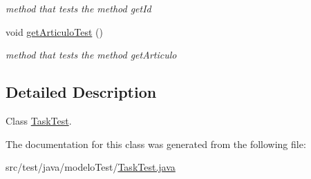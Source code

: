 \begin{DoxyCompactItemize}
\begin{DoxyCompactList}\small\item\em method that tests the method get\+Id \end{DoxyCompactList}\item 
\mbox{\label{classmodelo_test_1_1_task_test_ac7cb90633bdd40e104b1fb9a55f4eea3}} 
void \mbox{\hyperlink{classmodelo_test_1_1_task_test_ac7cb90633bdd40e104b1fb9a55f4eea3}{get\+Articulo\+Test}} ()
\begin{DoxyCompactList}\small\item\em method that tests the method get\+Articulo \end{DoxyCompactList}\end{DoxyCompactItemize}


\subsection{Detailed Description}
Class \mbox{\hyperlink{classmodelo_test_1_1_task_test}{Task\+Test}}. 

The documentation for this class was generated from the following file\+:\begin{DoxyCompactItemize}
\item 
src/test/java/modelo\+Test/\mbox{\hyperlink{_task_test_8java}{Task\+Test.\+java}}\end{DoxyCompactItemize}

